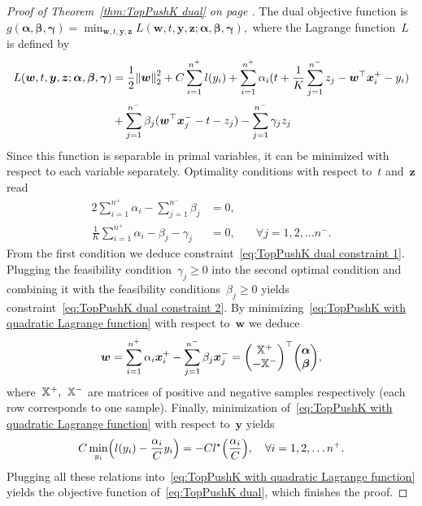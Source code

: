 \begin{proof}[Proof of Theorem~\ref{thm:TopPushK dual} on page \pageref{thm:TopPushK dual}]
  The dual objective function is~$g(\bm{\alpha}, \bm{\beta}, \bm{\gamma}) = \min_{\bm{w}, t, \bm{y}, \bm{z}} L(\bm{w}, t, \bm{y}, \bm{z}; \bm{\alpha}, \bm{\beta}, \bm{\gamma}),$ where the Lagrange function~$L$ is defined by
  \begin{equation}\label{eq:TopPushK with quadratic Lagrange function}
    \begin{aligned}
      L(\bm{w}, t, \bm{y}, \bm{z}; \bm{\alpha}, \bm{\beta}, \bm{\gamma})
      & = \frac{1}{2} \norm{\bm{w}}_{2}^{2}
        + C \sum_{i = 1}^{n^+} l(y_i)
        + \sum_{i = 1}^{n^+} \alpha_i(t + \frac{1}{K} \sum_{j = 1}^{n^-} z_j - \bm{w}^\top\bm{x}^+_i - y_i) \\ 
      & + \sum_{j = 1}^{n^-} \beta_j (\bm{w}^{\top}\bm{x}^-_j - t - z_j)
        - \sum_{j = 1}^{n^-} \gamma_j z_j
    \end{aligned}
  \end{equation}
  Since this function is separable in primal variables, it can be minimized with respect to each variable separately. Optimality conditions with respect to~$t$ and~$\bm{z}$ read
  \begin{alignat*}{2}
    \sum_{i = 1}^{n^+} \alpha_i - \sum_{j = 1}^{n^-} \beta_j     & = 0, \\
    \frac{1}{K} \sum_{i = 1}^{n^+} \alpha_i - \beta_j - \gamma_j & = 0, & \quad \forall j = 1, 2, \ldots n^-.
  \end{alignat*}
  From the first condition we deduce constraint~\eqref{eq:TopPushK dual constraint 1}. Plugging the feasibility condition~$\gamma_j \geq 0$ into the second optimal condition and combining it with the feasibility conditions~$\beta_j \geq 0$ yields constraint~\eqref{eq:TopPushK dual constraint 2}. By minimizing~\eqref{eq:TopPushK with quadratic Lagrange function} with respect to~$\bm{w}$ we deduce
  \begin{equation*}
    \bm{w}
        = \sum_{i = 1}^{n^+} \alpha_i \bm{x}^+_i - \sum_{j = 1}^{n^-} \beta_j \bm{x}^-_j
        = \Matrix{\X^+ \\ - \X^-}^\top \Matrix{\bm{\alpha} \\ \bm{\beta}},
  \end{equation*}
  where~$\mathbb{X}^+,$~$\mathbb{X}^-$ are matrices of positive and negative samples respectively (each row corresponds to one sample). Finally, minimization of~\eqref{eq:TopPushK with quadratic Lagrange function} with respect to~$\bm{y}$ yields
  \begin{equation*}
    C \min_{y_i} \Brac{l(y_i) - \frac{\alpha_i}{C} y_i} = - C l^{\star} \Brac{\frac{\alpha_i}{C}}, \quad \forall i = 1, 2, \ldots n^+.
  \end{equation*}
  Plugging all these relations into~\eqref{eq:TopPushK with quadratic Lagrange function} yields the objective function of~\eqref{eq:TopPushK dual}, which finishes the proof.
\end{proof}

